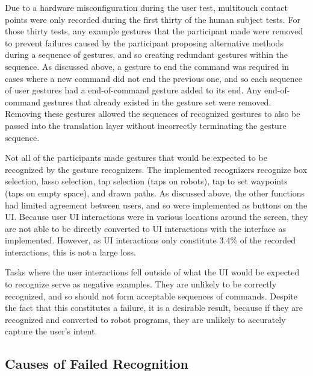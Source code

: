 Due to a hardware misconfiguration during the user test, multitouch contact points were only recorded during the first thirty of the human subject tests. 
For those thirty tests, any example gestures that the participant made were removed to prevent failures caused by the participant proposing alternative methods during a sequence of gestures, and so creating redundant gestures within the sequence. 
As discussed above, a gesture to end the command was required in cases where a new command did not end the previous one, and so each sequence of user gestures had a end-of-command gesture added to its end. 
Any end-of-command gestures that already existed in the gesture set were removed. 
Removing these gestures allowed the sequences of recognized gestures to also be passed into the translation layer without incorrectly terminating the gesture sequence.

Not all of the participants made gestures that would be expected to be recognized by the gesture recognizers. 
The implemented recognizers recognize box selection, lasso selection, tap selection (taps on robots), tap to set waypoints (taps on empty space), and drawn paths. 
As discussed above, the other functions had limited agreement between users, and so were implemented as buttons on the UI. 
Because user UI interactions were in various locations around the screen, they are not able to be directly converted to UI interactions with the interface as implemented. 
However, as UI interactions only constitute 3.4\% of the recorded interactions, this is not a large loss. 

Tasks where the user interactions fell outside of what the UI would be expected to recognize serve as negative examples.
They are unlikely to be correctly recognized, and so should not form acceptable sequences of commands. 
Despite the fact that this constitutes a failure, it is a desirable result, because if they are recognized and converted to robot programs, they are unlikely to accurately capture the user's intent. 

\subsection{Causes of Failed Recognition}

